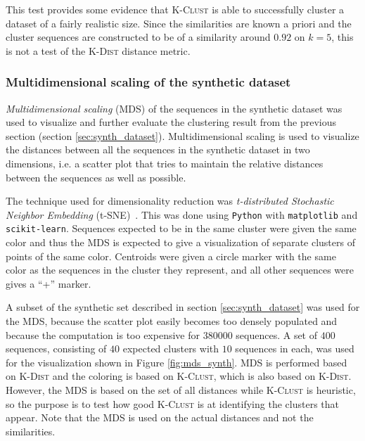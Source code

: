 This test provides some evidence that \textsc{K-Clust} is able to successfully
cluster a dataset of a fairly realistic size. Since the similarities are known
a priori and the cluster sequences are constructed to be of a similarity around
$0.92$ on $k=5$, this is not a test of the \textsc{K-Dist} distance metric.


\subsubsection{Multidimensional scaling of the synthetic dataset}
\label{sec:mds_synth}



\emph{Multidimensional scaling} (MDS) of the sequences in the synthetic dataset
was used to visualize and further evaluate the clustering result from the
previous section (section \ref{sec:synth_dataset}). Multidimensional scaling is
used to visualize the distances between all the sequences in the synthetic
dataset in two dimensions, i.e. a scatter plot that tries to maintain the
relative distances between the sequences as well as possible.

The technique used for dimensionality reduction was \emph{t-distributed
Stochastic Neighbor Embedding} (t-SNE)~\cite{maaten}. This was done using
\texttt{Python} with \texttt{matplotlib} and \texttt{scikit-learn}. Sequences
expected to be in the same cluster were given the same color and thus the MDS
is expected to give a visualization of separate clusters of points of the same
color. Centroids were given a circle marker with the same color as the
sequences in the cluster they represent, and all other sequences were gives a
``+'' marker.

A subset of the synthetic set described in section \ref{sec:synth_dataset} was
used for the MDS, because the scatter plot easily becomes too densely
populated and because the computation is too expensive for \num{380000}
sequences. A set of $400$ sequences, consisting of $40$ expected clusters with
$10$ sequences in each, was used for the visualization shown in Figure
\ref{fig:mds_synth}. MDS is performed based on \textsc{K-Dist} and the
coloring is based on \textsc{K-Clust}, which is also based on \textsc{K-Dist}.
However, the MDS is based on the set of all distances while \textsc{K-Clust}
is heuristic, so the purpose is to test how good \textsc{K-Clust} is at
identifying the clusters that appear. Note that the MDS is used on the actual
distances and not the similarities.

